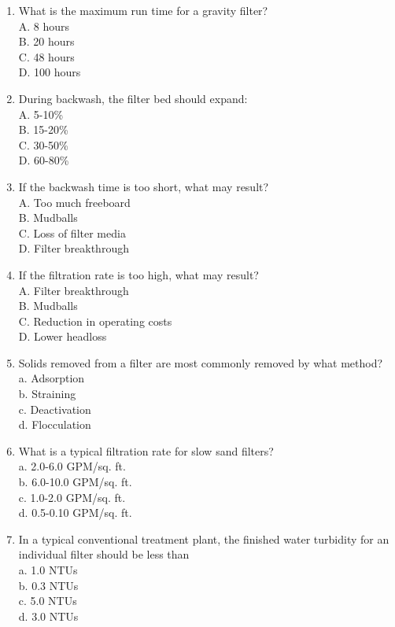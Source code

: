 \begin{enumerate}
\item What is the maximum run time for a gravity filter?\\
A. 8 hours\\
B. 20 hours\\
C. 48 hours\\
D. 100 hours\\

\item During backwash, the filter bed should expand:\\
A. 5-10\%\\
B. 15-20\%\\
C. 30-50\%\\
D. 60-80\%\\

\item If the backwash time is too short, what may result?\\
A. Too much freeboard\\
B. Mudballs\\
C. Loss of filter media\\
D. Filter breakthrough\\

\item If the filtration rate is too high, what may result?\\
A. Filter breakthrough\\
B. Mudballs\\
C. Reduction in operating costs\\
D. Lower headloss\\

\item Solids removed from a filter are most commonly removed by what method? \\
a. Adsorption \\
b. Straining \\
c. Deactivation \\
d. Flocculation \\

\item What is a typical filtration rate for slow sand filters? \\
a. 2.0-6.0 GPM/sq. ft. \\
b. 6.0-10.0 GPM/sq. ft. \\
c. 1.0-2.0 GPM/sq. ft. \\
d. 0.5-0.10 GPM/sq. ft. \\

\item In a typical conventional treatment plant, the finished water turbidity for an individual filter should be less than \\
a. 1.0 NTUs \\
b. 0.3 NTUs \\
c. 5.0 NTUs \\
d. 3.0 NTUs \\


\end{enumerate}
